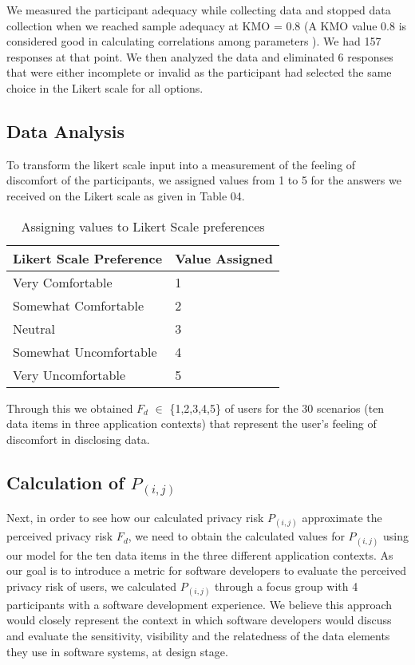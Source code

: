 \documentclass[10pt]{article}
\begin{document}
We measured the participant adequacy while collecting data and stopped data collection when we reached sample adequacy at KMO = 0.8 (A KMO value $0.8$ is considered good in calculating correlations among parameters \cite {kim1978factor}). We had 157 responses at that point. We then analyzed the data and eliminated 6 responses that were either incomplete or invalid as the participant had selected the same choice in the Likert scale for all options.

\subsection {Data Analysis}

To transform the likert scale input into a measurement of the feeling of discomfort of the participants, we assigned values from 1 to 5 for the answers we received on the Likert scale as given in Table 04.

\begin{center}
\begin{table}[htbp]
\caption{Assigning values to Likert Scale preferences}
\begin{center}
\begin{tabular}{|l|l|} 
\hline
Likert Scale Preference & Value Assigned \\
\hline
Very Comfortable & 1\\
\hline
Somewhat Comfortable& 2 \\
\hline
Neutral & 3  \\
\hline
Somewhat Uncomfortable & 4 \\
\hline
Very Uncomfortable & 5 \\
\hline
\end{tabular}
\end{center}
\end{table}
\end{center}

Through this we obtained $F_d$ $\in$ \{1,2,3,4,5\} of users for the 30 scenarios (ten data items in three application contexts) that represent the user's feeling of discomfort in disclosing data.

\subsection {Calculation of $P_{(i,j)}$}

Next, in order to see how our calculated privacy risk $P_{(i,j)}$ approximate the perceived privacy risk $F_d$, we need to obtain the calculated values for $P_{(i,j)}$ using our model for the ten data items in the three different application contexts. As our goal is to introduce a metric for software developers to evaluate the perceived privacy risk of users, we calculated $P_{(i,j)}$ through a focus group with 4 participants with a software development experience. We believe this approach would closely represent the context in which software developers would discuss and evaluate the sensitivity, visibility and the relatedness of the data elements they use in software systems, at design stage. 
\end{document}
